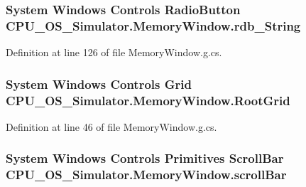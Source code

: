 \subsubsection[{rdb\+\_\+\+String}]{\setlength{\rightskip}{0pt plus 5cm}System Windows Controls Radio\+Button C\+P\+U\+\_\+\+O\+S\+\_\+\+Simulator.\+Memory\+Window.\+rdb\+\_\+\+String\hspace{0.3cm}{\ttfamily [package]}}\label{class_c_p_u___o_s___simulator_1_1_memory_window_a68b5f36b0514cacaa8e4eeb3415fcd5a}


Definition at line 126 of file Memory\+Window.\+g.\+cs.

\hypertarget{class_c_p_u___o_s___simulator_1_1_memory_window_ae2c7b1b6f5c337af62d18b0e2a4d098c}{}
\subsubsection[{Root\+Grid}]{\setlength{\rightskip}{0pt plus 5cm}System Windows Controls Grid C\+P\+U\+\_\+\+O\+S\+\_\+\+Simulator.\+Memory\+Window.\+Root\+Grid\hspace{0.3cm}{\ttfamily [package]}}\label{class_c_p_u___o_s___simulator_1_1_memory_window_ae2c7b1b6f5c337af62d18b0e2a4d098c}


Definition at line 46 of file Memory\+Window.\+g.\+cs.

\hypertarget{class_c_p_u___o_s___simulator_1_1_memory_window_a2ab8c6459135d66de58829173f0bee5b}{}
\subsubsection[{scroll\+Bar}]{\setlength{\rightskip}{0pt plus 5cm}System Windows Controls Primitives Scroll\+Bar C\+P\+U\+\_\+\+O\+S\+\_\+\+Simulator.\+Memory\+Window.\+scroll\+Bar\hspace{0.3cm}{\ttfamily [package]}}\label{class_c_p_u___o_s___simulator_1_1_memory_window_a2ab8c6459135d66de58829173f0bee5b}


